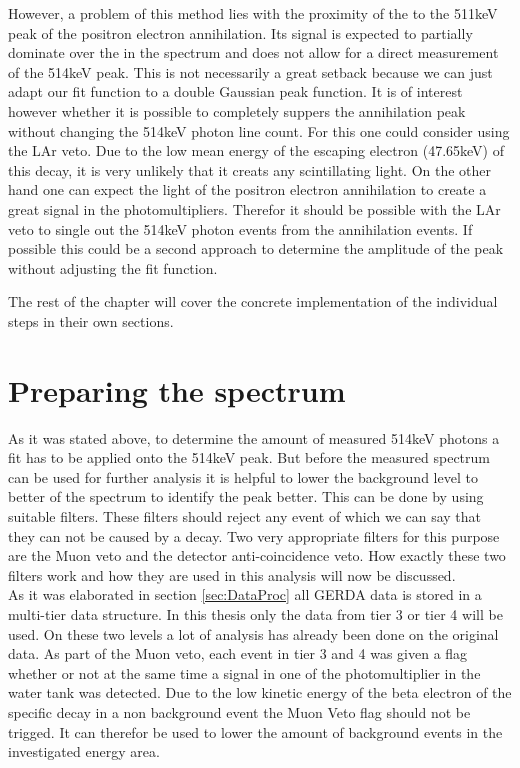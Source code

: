 \documentclass[encoding=utf8,british]{tumphthesis}
\begin{document}
However, a problem of this method lies with the proximity of the \Kr to the 511keV peak of the positron electron annihilation. 
Its signal is expected to partially dominate over the \Kr in the spectrum and does not allow for a direct measurement of the 514keV peak. 
This is not necessarily a great setback because we can just adapt our fit function to a double Gaussian peak function.
It is of interest however whether it is possible to completely suppers the annihilation peak without changing the 514keV photon line count.
For this one could consider using the LAr veto.
Due to the low mean energy of the escaping electron (47.65keV) of this decay, it is very unlikely that it creats any scintillating light. 
On the other hand one can expect the light of the positron electron annihilation to create a great signal in the photomultipliers.
Therefor it should be possible with the LAr veto to single out the 514keV photon events from the annihilation events.
If possible this could be a second approach to determine the amplitude of the peak without adjusting the fit function.

The rest of the chapter will cover the concrete implementation of the individual steps in their own sections.
\\
\section{Preparing the spectrum}

As it was stated above, to determine the amount of measured 514keV photons a fit has to be applied onto the 514keV peak. 
But before the measured spectrum can be used for further analysis it is helpful to lower the background level to better of the spectrum to identify the peak better.
This can be done by using suitable filters.
These filters should reject any event of which we can say that they can not be caused by a \Kr decay.
Two very appropriate filters for this purpose are the Muon veto and the detector anti-coincidence veto.
How exactly these two filters work and how they are used in this analysis will now be discussed.
\\

As it was elaborated in section \ref{sec:DataProc} all GERDA data is stored in a multi-tier data structure. 
In this thesis only the data from tier 3 or tier 4 will be used.
On these two levels a lot of analysis has already been done on the original data. 
As part of the Muon veto, each event in tier 3 and 4 was given a flag whether or not at the same time a signal in one of the photomultiplier in the water tank was detected. 
Due to the low kinetic energy of the beta electron of the specific \Kr decay in a non background event the Muon Veto flag should not be trigged.
It can therefor be used to lower the amount of background events in the investigated energy area.
\\
\end{document}
